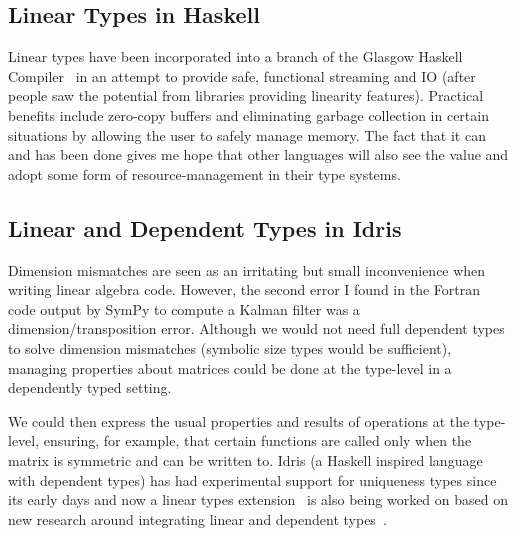 \subsection{Linear Types in Haskell}

Linear types have been incorporated into a branch of the Glasgow Haskell
Compiler~\cite{retrofitting} in an attempt to provide safe, functional
streaming and IO (after people saw the potential from libraries providing
linearity features). Practical benefits include zero-copy buffers and
eliminating garbage collection in certain situations by allowing the user to
safely manage memory. The fact that it can and has been done gives me hope that
other languages will also see the value and adopt some form of
resource-management in their type systems.

\subsection{Linear and Dependent Types in Idris}\label{subsec:lin_dep_types}

Dimension mismatches are seen as an irritating but small inconvenience when
writing linear algebra code. However, the second error I found in the Fortran
code output by SymPy to compute a Kalman filter was a dimension/transposition
error. Although we would not need full dependent types to solve dimension
mismatches (symbolic size types would be sufficient), managing properties about
matrices could be done at the type-level in a dependently typed setting.

We could then express the usual properties and results of operations at the
type-level, ensuring, for example, that certain functions are called only when
the matrix is symmetric and can be written to. Idris (a Haskell inspired
language with dependent types) has had experimental support for uniqueness
types since its early days and now a linear types extension~\cite{idris_linear}
is also being worked on based on new research around integrating linear and
dependent types~\cite{atkey}.
